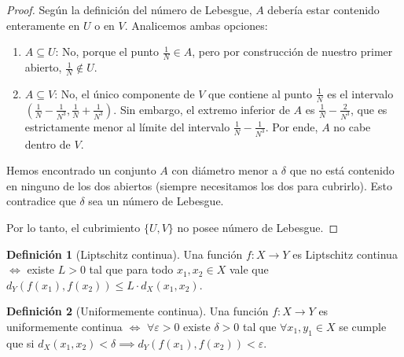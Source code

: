 \documentclass{article}
\theoremstyle{plain}
\theoremstyle{definition}
\newtheorem{definition}{Definición}[section]
\begin{document}
\begin{proof}
    Según la definición del número de Lebesgue, \( A \) debería estar contenido enteramente en \( U \) o en \( V \). Analicemos ambas opciones:
    \begin{enumerate}
        \item \( A \subseteq U \): No, porque el punto \( \frac{1}{N} \in A \), pero por construcción de nuestro primer abierto, \( \frac{1}{N} \notin U \).
        \item \( A \subseteq V \): No, el único componente de \( V \) que contiene al punto \( \frac{1}{N} \) es el intervalo \( \left( \frac{1}{N} - \frac{1}{N^3}, \frac{1}{N} + \frac{1}{N^3} \right) \). Sin embargo, el extremo inferior de \( A \) es \( \frac{1}{N} - \frac{2}{N^3} \), que es estrictamente menor al límite del intervalo \( \frac{1}{N} - \frac{1}{N^3} \). Por ende, \( A \) no cabe dentro de \( V \).
    \end{enumerate}

    Hemos encontrado un conjunto \( A \) con diámetro menor a \( \delta \) que no está contenido en ninguno de los dos abiertos (siempre necesitamos los dos para cubrirlo). Esto contradice que \( \delta \) sea un número de Lebesgue.

    Por lo tanto, el cubrimiento \( \{U, V\} \) no posee número de Lebesgue.
\end{proof}

\begin{definition}[Liptschitz continua]
    Una función \( f : X \to Y \) es Liptschitz continua \( \iff \) existe \( L > 0 \) tal que para todo \( x_1, x_2 \in X \) vale que \( d_Y(f(x_1), f(x_2)) \leq L \cdot d_X(x_1, x_2) \).
\end{definition}
\begin{definition}[Uniformemente continua]
    Una función \( f : X \to Y \) es uniformemente continua \( \iff \) \( \forall \varepsilon > 0 \) existe \( \delta > 0 \) tal que \( \forall x_1, y_1 \in X \) se cumple que si \( d_X(x_1, x_2) < \delta \implies d_Y(f(x_1), f(x_2)) < \varepsilon \).
\end{definition}
\end{document}
